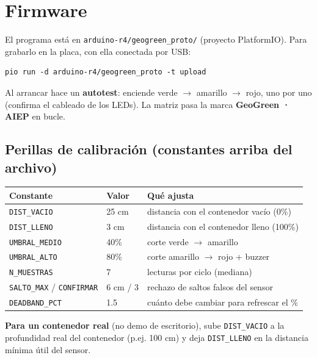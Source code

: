 \documentclass[10pt,letterpaper]{article}
\begin{document}
\section{Firmware}
El programa está en \texttt{arduino-r4/geogreen\_proto/} (proyecto PlatformIO). Para grabarlo en
la placa, con ella conectada por USB:

\begin{lstlisting}[style=cmd]
pio run -d arduino-r4/geogreen_proto -t upload
\end{lstlisting}

Al arrancar hace un \textbf{autotest}: enciende verde $\rightarrow$ amarillo $\rightarrow$ rojo,
uno por uno (confirma el cableado de los LEDs). La matriz pasa la marca \textbf{GeoGreen · AIEP}
en bucle.

\subsection{Perillas de calibración (constantes arriba del archivo)}
\begin{tabularx}{\linewidth}{@{}L{4.2cm}L{2.2cm}Y@{}}
\hline
\textbf{Constante} & \textbf{Valor} & \textbf{Qué ajusta}\\
\hline
\texttt{DIST\_VACIO} & 25 cm & distancia con el contenedor vacío (0\%)\\
\texttt{DIST\_LLENO} & 3 cm & distancia con el contenedor lleno (100\%)\\
\texttt{UMBRAL\_MEDIO} & 40\% & corte verde $\rightarrow$ amarillo\\
\texttt{UMBRAL\_ALTO} & 80\% & corte amarillo $\rightarrow$ rojo + buzzer\\
\texttt{N\_MUESTRAS} & 7 & lecturas por ciclo (mediana)\\
\texttt{SALTO\_MAX} / \texttt{CONFIRMAR} & 6 cm / 3 & rechazo de saltos falsos del sensor\\
\texttt{DEADBAND\_PCT} & 1.5 & cuánto debe cambiar para refrescar el \%\\
\hline
\end{tabularx}

\begin{nota}
\textbf{Para un contenedor real} (no demo de escritorio), sube \texttt{DIST\_VACIO} a la
profundidad real del contenedor (p.ej. 100 cm) y deja \texttt{DIST\_LLENO} en la distancia mínima
útil del sensor.
\end{nota}

\end{document}
